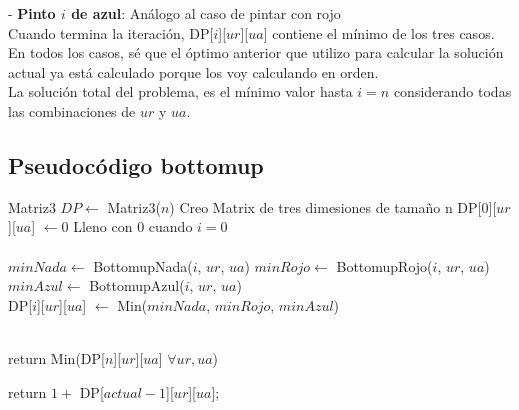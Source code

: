- \textbf{Pinto $i$ de azul}:  Análogo al caso de pintar con rojo  \\

Cuando termina la iteración, DP[$i$][$ur$][$ua$] contiene el mínimo de los tres casos. En todos los casos, sé que el óptimo anterior que utilizo para calcular la solución actual ya está calculado porque los voy calculando en orden. \\

La solución total del problema, es el mínimo valor hasta $i = n$ considerando todas las combinaciones de $ur$ y $ua$.

\subsection{Pseudocódigo bottomup}

\begin{algorithm}[H]
\begin{algorithmic}
  \State Matriz3 $DP \gets$ Matriz3($n$)  \Comment Creo Matrix de tres dimesiones de tamaño n 
  \State DP[$0$][$ur$][$ua$] $\gets 0$  \Comment Lleno con $0$ cuando $i = 0$ \\

             \\

                \State $minNada \gets$ BottomupNada($i$, $ur$, $ua$)
                \State $minRojo \gets$ BottomupRojo($i$, $ur$, $ua$)
                \State $minAzul \gets$ BottomupAzul($i$, $ur$, $ua$) \\  

                \State DP[$i$][$ur$][$ua$] $\gets$ Min($minNada$, $minRojo$, $minAzul$)
            
            \EndFor
        \EndFor
    \EndFor \\

    \State return Min(DP[$n$][$ur$][$ua$] $\forall ur, ua$)

\EndProcedure
\end{algorithmic}
\end{algorithm}


\begin{algorithm}[H]
\begin{algorithmic}
    \State return $1 +$ DP[$actual-1$][$ur$][$ua$];
\EndProcedure
\end{algorithmic}
\end{algorithm}



